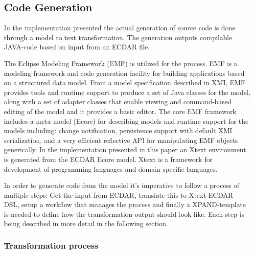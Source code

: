\subsection{Code Generation}
\label{implementation-code-generation}

In the implementation presented the actual generation of source code is done
through a model to text transformation. The generation outputs compilable
JAVA-code based on input from an ECDAR file.

The Eclipse Modeling Framework (EMF) is utilized for the process. EMF is a
modeling framework and code generation facility for building applications based
on a structured data model. From a model specification described in XMI, EMF
provides tools and runtime support to produce a set of Java classes for the
model, along with a set of adapter classes that enable viewing and command-based
editing of the model and it provides a basic editor.  The core EMF framework
includes a meta model (Ecore) for describing models and runtime support for the
models including: change notification, persistence support with default XMI
serialization, and a very efficient reflective API for manipulating EMF objects
generically. In the implementation presented in this paper an Xtext environment
is generated from the ECDAR Ecore model. Xtext is a framework for development of
programming languages and domain specific languages.

In order to generate code from the model it's imperative to follow a process of
multiple steps: Get the input from ECDAR, translate this to Xtext ECDAR DSL,
setup a workflow that manages the process and finally a XPAND-template is needed
to define how the transformation output should look like. Each step is being
described in more detail in the following section.

\subsubsection{Transformation process}
\label{transformation-process}

